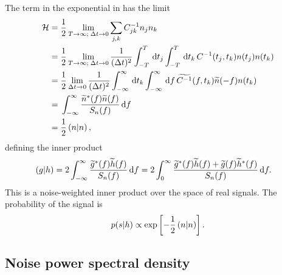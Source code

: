 The term in the exponential in  has the limit
\begin{align}
\mathcal{H} = {} & \frac{1}{2}\lim_{T \rightarrow \infty; \; \Delta t \rightarrow 0} \sum_{j,k}C^{-1}_{jk}n_j n_k \nonumber \\
 = {} & \frac{1}{2}\lim_{T \rightarrow \infty; \; \Delta t \rightarrow 0} \frac{1}{(\Delta t)^2}\int_{-T}^{T}\,\mathrm{d} t_j \int_{-T}^{T}\,\mathrm{d} t_k \, C^{-1}(t_j,t_k) n(t_j)n(t_k) \nonumber \\
 = {} & \frac{1}{2}\lim_{\Delta t \rightarrow 0} \frac{1}{(\Delta t)^2} \int_{-\infty}^{\infty}\,\mathrm{d} t_k \int_{-\infty}^{\infty}\,\mathrm{d} f \, \widetilde{C^{-1}}(f,t_k)\widetilde{n}(-f)n(t_k) \nonumber \\
 = {} & \int_{-\infty}^{\infty}{\frac{\widetilde{n}^\ast(f)\widetilde{n}(f)}{S_n(f)}}\,\mathrm{d}{f} \nonumber \\
 = {} & \frac{1}{2}\left({n}\middle|{n}\right),
 \end{align}
defining the inner product
\begin{align}
\left({g}\middle|{h}\right) = {} & 2\int_{-\infty}^{\infty}{\frac{\widetilde{g}^\ast(f)\widetilde{h}(f)}{S_n(f)}}\,\mathrm{d}{f} = 2 \int_{0}^{\infty}{\frac{\widetilde{g}^\ast(f)\widetilde{h}(f) + \widetilde{g}(f)\widetilde{h}^\ast(f)}{S_n(f)}}\,\mathrm{d}{f}.
\end{align}
This is a noise-weighted inner product over the space of real signals. The probability of the signal is
\begin{equation}
p(s|h) \propto \exp\left[-\frac{1}{2}\left({n}\middle|{n}\right)\right].
\end{equation}

\subsection{Noise power spectral density}

